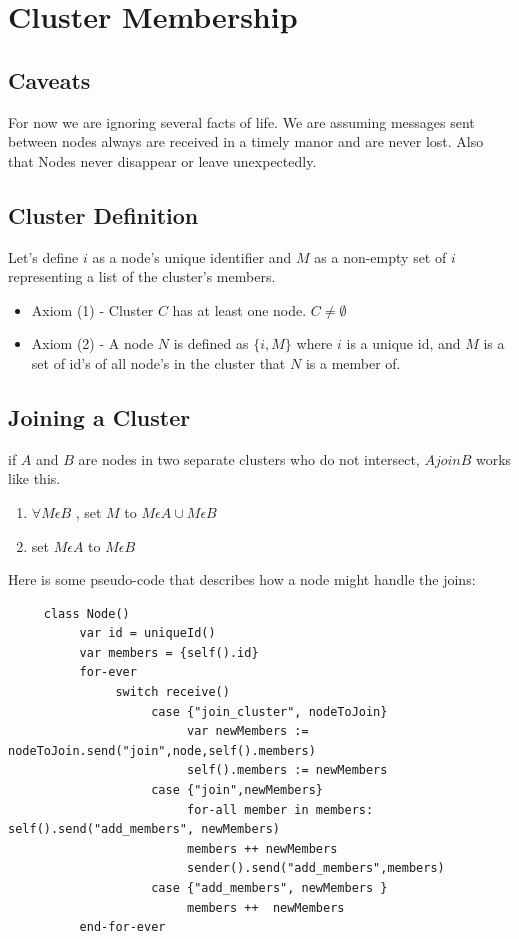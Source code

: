 \documentclass[11pt]{article}
\begin{document}
\section{Cluster Membership}
\subsection{Caveats}
For now we are ignoring several facts of life.  We are assuming messages sent between nodes always are received in a timely manor and are never lost.  Also that Nodes never disappear or leave unexpectedly.
\subsection{Cluster Definition}
Let's define $i$ as a node's unique identifier and $M$ as a non-empty set of $i$ representing a list of the cluster's members.

\begin{itemize}
\item Axiom (1) - Cluster $C$ has at least one node.  $C \not= \emptyset$
\item Axiom (2) - A node $N$ is defined as $\{i,M\}$ where $i$ is a unique id, and $M$ is a set of id's of all  node's in the cluster that $N$ is a member of. 
\end{itemize}

\subsection{Joining a Cluster}
if $A$ and $B$ are nodes in two separate clusters who do not intersect, $A join B$ works like this.


\begin{enumerate}
\item $\forall M \epsilon B$ , set $M$  to $M\epsilon A \cup M\epsilon B$
\item set $M \epsilon A$ to $M\epsilon B$

\end{enumerate}




Here is some pseudo-code that describes how a node might handle the joins:


\begin{verbatim}
     class Node()
          var id = uniqueId()
          var members = {self().id}
          for-ever
               switch receive()
                    case {"join_cluster", nodeToJoin}
                         var newMembers := nodeToJoin.send("join",node,self().members)
                         self().members := newMembers
                    case {"join",newMembers}
                         for-all member in members: self().send("add_members", newMembers)
                         members ++ newMembers
                         sender().send("add_members",members)
                    case {"add_members", newMembers }
                         members ++  newMembers
          end-for-ever
\end{verbatim}
\end{document}
